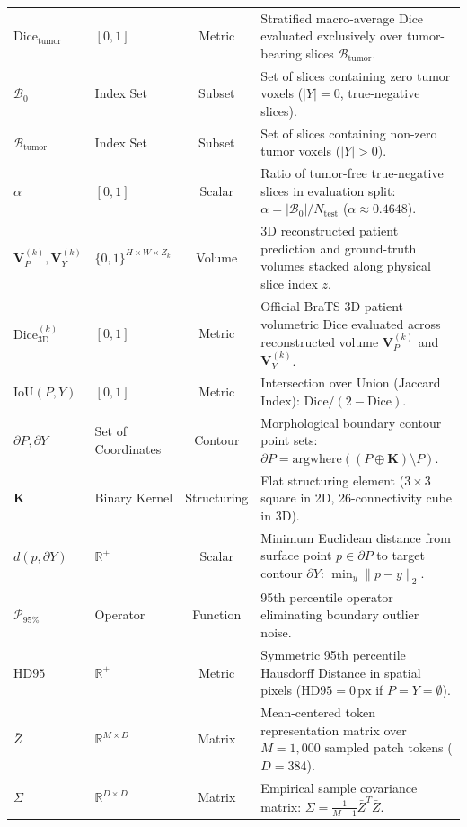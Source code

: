 \documentclass{article}
\begin{document}
\begin{table}[ht]
{\begin{tabular}{llcp{8.2cm}}
$\text{Dice}_{\text{tumor}}$ & $[0, 1]$ & Metric & Stratified macro-average Dice evaluated exclusively over tumor-bearing slices $\mathcal{B}_{\text{tumor}}$. \\
$\mathcal{B}_0$ & Index Set & Subset & Set of slices containing zero tumor voxels ($|Y| = 0$, true-negative slices). \\
$\mathcal{B}_{\text{tumor}}$ & Index Set & Subset & Set of slices containing non-zero tumor voxels ($|Y| > 0$). \\
$\alpha$ & $[0, 1]$ & Scalar & Ratio of tumor-free true-negative slices in evaluation split: $\alpha = |\mathcal{B}_0| / N_{\text{test}}$ ($\alpha \approx 0.4648$). \\
$\mathbf{V}_P^{(k)}, \mathbf{V}_Y^{(k)}$ & $\{0, 1\}^{H \times W \times Z_k}$ & Volume & 3D reconstructed patient prediction and ground-truth volumes stacked along physical slice index $z$. \\
$\text{Dice}_{\text{3D}}^{(k)}$ & $[0, 1]$ & Metric & Official BraTS 3D patient volumetric Dice evaluated across reconstructed volume $\mathbf{V}_P^{(k)}$ and $\mathbf{V}_Y^{(k)}$. \\
$\text{IoU}(P, Y)$ & $[0, 1]$ & Metric & Intersection over Union (Jaccard Index): $\text{Dice} / (2 - \text{Dice})$. \\
$\partial P, \partial Y$ & Set of Coordinates & Contour & Morphological boundary contour point sets: $\partial P = \text{argwhere}((P \oplus \mathbf{K}) \setminus P)$. \\
$\mathbf{K}$ & Binary Kernel & Structuring & Flat structuring element ($3 \times 3$ square in 2D, 26-connectivity cube in 3D). \\
$d(p, \partial Y)$ & $\mathbb{R}^+$ & Scalar & Minimum Euclidean distance from surface point $p \in \partial P$ to target contour $\partial Y$: $\min_{y} \|p - y\|_2$. \\
$\mathcal{P}_{\text{95\%}}$ & Operator & Function & 95th percentile operator eliminating boundary outlier noise. \\
$\text{HD95}$ & $\mathbb{R}^+$ & Metric & Symmetric 95th percentile Hausdorff Distance in spatial pixels ($\text{HD95} = 0\,\text{px}$ if $P=Y=\emptyset$). \\
$\bar{Z}$ & $\mathbb{R}^{M \times D}$ & Matrix & Mean-centered token representation matrix over $M = 1,000$ sampled patch tokens ($D = 384$). \\
$\Sigma$ & $\mathbb{R}^{D \times D}$ & Matrix & Empirical sample covariance matrix: $\Sigma = \frac{1}{M-1} \bar{Z}^T \bar{Z}$. \\

\end{tabular}}
\end{table}
\end{document}
